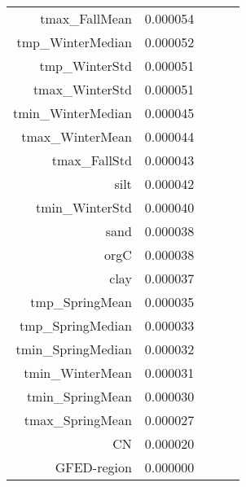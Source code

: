 \begin{tabular}{rrrrr}
tmax_FallMean & 0.000054 \\
tmp_WinterMedian & 0.000052 \\
tmp_WinterStd & 0.000051 \\
tmax_WinterStd & 0.000051 \\
tmin_WinterMedian & 0.000045 \\
tmax_WinterMean & 0.000044 \\
tmax_FallStd & 0.000043 \\
silt & 0.000042 \\
tmin_WinterStd & 0.000040 \\
sand & 0.000038 \\
orgC & 0.000038 \\
clay & 0.000037 \\
tmp_SpringMean & 0.000035 \\
tmp_SpringMedian & 0.000033 \\
tmin_SpringMedian & 0.000032 \\
tmin_WinterMean & 0.000031 \\
tmin_SpringMean & 0.000030 \\
tmax_SpringMean & 0.000027 \\
CN & 0.000020 \\
GFED-region & 0.000000 \\
\bottomrule
\end{tabular}
